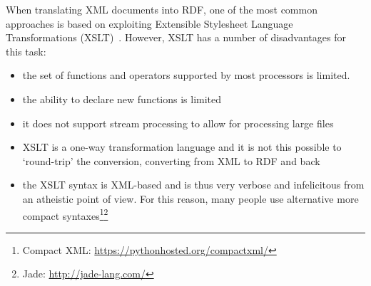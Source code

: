 \documentclass{llncs}
\begin{document}
{When translating XML documents into RDF, one of the most common approaches is
based on exploiting Extensible Stylesheet Language Transformations
(XSLT)~\cite{wustner2002converting,van2008xml,borin2014representing}. However, XSLT has a number of disadvantages
for this task:
\begin{itemize}
\item the set of functions and operators supported by most processors is
limited.
\item the ability to declare new functions is limited
\item it does not support stream processing to allow for processing large files 
\item XSLT is a one-way transformation language and it is not this possible
to `round-trip' the conversion, converting from XML to RDF and back
\item the XSLT syntax is XML-based and is thus very verbose and infelicitous from an atheistic point of view.
For this reason, many people use alternative
more compact syntaxes\footnote{Compact XML:
\url{https://pythonhosted.org/compactxml/}}\footnote{Jade:
\url{http://jade-lang.com/}}
\end{itemize}

}
\end{document}
